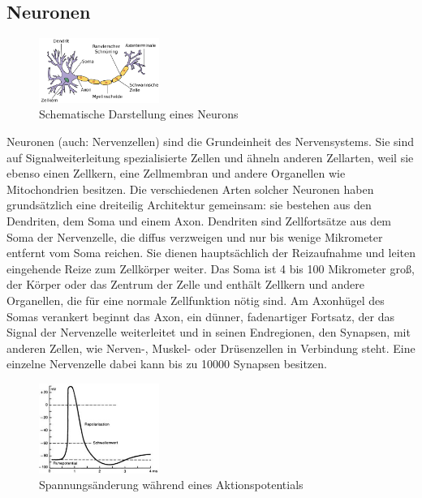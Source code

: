 \subsection{Neuronen}
\label{sec:neurons}
\begin{figure}
	\centering
	\includegraphics[width=0.35\textwidth]{abb/neuron.png}
	\caption{Schematische Darstellung eines Neurons}
\end{figure}
Neuronen (auch: Nervenzellen) sind die Grundeinheit des Nervensystems. Sie sind auf Signalweiterleitung spezialisierte Zellen und ähneln anderen Zellarten, weil sie ebenso einen Zellkern, eine Zellmembran und andere Organellen wie Mitochondrien besitzen. Die verschiedenen Arten solcher Neuronen haben grundsätzlich eine dreiteilig Architektur gemeinsam: sie bestehen aus den Dendriten, dem Soma und einem Axon. Dendriten sind Zellfortsätze aus dem Soma der Nervenzelle, die diffus verzweigen und nur bis wenige Mikrometer entfernt vom Soma reichen. Sie dienen hauptsächlich der Reizaufnahme und leiten eingehende Reize zum Zellkörper weiter. Das Soma ist 4 bis 100 Mikrometer groß, der Körper oder das Zentrum der Zelle und enthält Zellkern und andere Organellen, die für eine normale Zellfunktion nötig sind. Am Axonhügel des Somas verankert beginnt das Axon, ein dünner, fadenartiger Fortsatz, der das Signal der Nervenzelle weiterleitet und in seinen Endregionen, den Synapsen, mit anderen Zellen, wie Nerven-, Muskel- oder Drüsenzellen in Verbindung steht. Eine einzelne Nervenzelle dabei kann bis zu 10000 Synapsen besitzen.\par
\begin{figure}
	\centering
	\includegraphics[width=0.35\textwidth]{abb/ap.jpg}
	\caption{Spannungsänderung während eines Aktionspotentials}
\end{figure}
